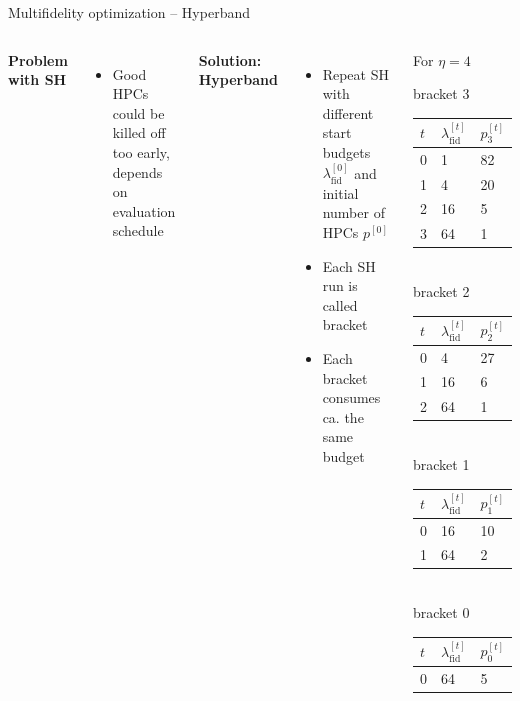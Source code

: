 \documentclass[11pt,compress,t,notes=noshow, xcolor=table]{beamer}
\begin{document}
\begin{vbframe}{Multifidelity optimization -- Hyperband}

\begin{columns}
\textbf{Problem with SH}
\begin{itemize}
    \item Good HPCs could be killed off too early, 
    depends on evaluation schedule
\end{itemize}
\textbf{Solution: Hyperband}
\begin{itemize}
\item Repeat SH with different start budgets $\lambda_{\text{fid}}^{[0]}$ and initial number of HPCs $p^{[0]}$ 
\item Each SH run is called bracket
\item Each bracket consumes ca. the same budget
\end{itemize}
\begin{footnotesize}
For $\eta = 4$ 
\begin{center}
bracket 3
\begin{tabular}{ l l l }
$t$ & $\lambda_{\text{fid}}^{[t]}$ & $p_3^{[t]}$ \\
\hline 
0 & 1 & 82 \\
1 & 4 & 20 \\
2 & 16 & 5 \\
3 & 64 & 1
\end{tabular} \\
\medskip
bracket 2
\begin{tabular}{ l l l }
$t$ & $\lambda_{\text{fid}}^{[t]}$ & $p_2^{[t]}$ \\
\hline 
0 & 4 & 27 \\
1 & 16 & 6 \\
2 & 64 & 1
\end{tabular} \\
\medskip
bracket 1
\begin{tabular}{ l l l }
$t$ & $\lambda_{\text{fid}}^{[t]}$ & $p_1^{[t]}$ \\
\hline 
0 & 16 & 10 \\
1 & 64 & 2
\end{tabular} \\
\medskip
bracket 0
\begin{tabular}{ l l l }

$t$ & $\lambda_{\text{fid}}^{[t]}$ & $p_0^{[t]}$ \\
\hline 
0 & 64 & 5
\end{tabular}

\end{center}
\end{footnotesize}
\end{columns}
\end{vbframe}
\end{document}
